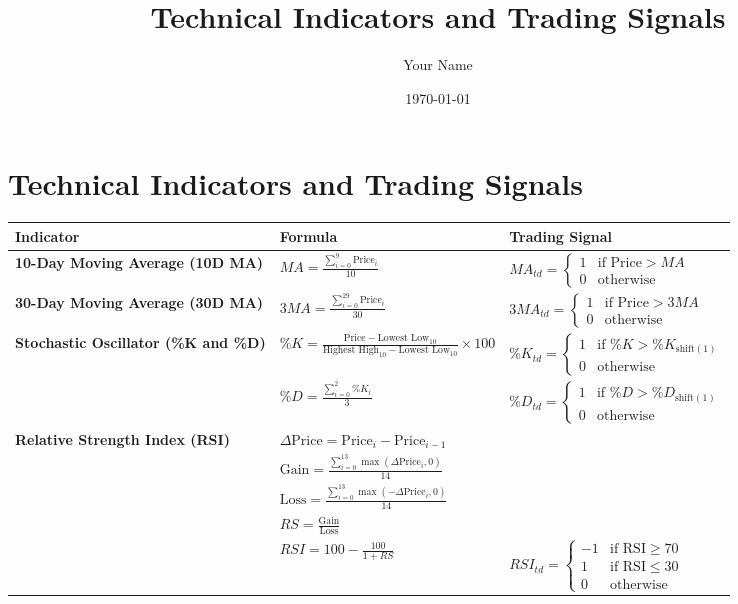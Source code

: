 \documentclass{article}
\begin{document}
\title{Technical Indicators and Trading Signals}
\author{Your Name}
\date{\today}
\maketitle

\section{Technical Indicators and Trading Signals}

\begin{table}[h!]
\centering
\begin{tabular}{| m{3cm} | m{8cm} | m{5cm} |}
\hline
\textbf{Indicator} & \textbf{Formula} & \textbf{Trading Signal} \\ \hline

\textbf{10-Day Moving Average (10D MA)} & 
$MA = \frac{\sum_{i=0}^{9} \text{Price}_i}{10}$ & 
$MA_{td} = \begin{cases} 
1 & \text{if Price} > MA \\
0 & \text{otherwise}
\end{cases}$ \\
\hline

\textbf{30-Day Moving Average (30D MA)} & 
$3MA = \frac{\sum_{i=0}^{29} \text{Price}_i}{30}$ & 
$3MA_{td} = \begin{cases} 
1 & \text{if Price} > 3MA \\
0 & \text{otherwise}
\end{cases}$ \\
\hline

\textbf{Stochastic Oscillator (\%K and \%D)} & 
$\%K = \frac{\text{Price} - \text{Lowest Low}_{10}}{\text{Highest High}_{10} - \text{Lowest Low}_{10}} \times 100$ &
$\%K_{td} = \begin{cases} 
1 & \text{if } \%K > \%K_{\text{shift}(1)} \\
0 & \text{otherwise}
\end{cases}$ \\
& $\%D = \frac{\sum_{i=0}^{2} \%K_i}{3}$ & 
$\%D_{td} = \begin{cases} 
1 & \text{if } \%D > \%D_{\text{shift}(1)} \\
0 & \text{otherwise}
\end{cases}$ \\
\hline

\textbf{Relative Strength Index (RSI)} & 
$\Delta \text{Price} = \text{Price}_{i} - \text{Price}_{i-1}$ \\
& $\text{Gain} = \frac{\sum_{i=0}^{13} \max(\Delta \text{Price}_i, 0)}{14}$ \\
& $\text{Loss} = \frac{\sum_{i=0}^{13} \max(-\Delta \text{Price}_i, 0)}{14}$ \\
& $RS = \frac{\text{Gain}}{\text{Loss}}$ \\
& $RSI = 100 - \frac{100}{1 + RS}$ &
$RSI_{td} = \begin{cases} 
-1 & \text{if RSI} \geq 70 \\
1 & \text{if RSI} \leq 30 \\
0 & \text{otherwise}
\end{cases}$ \\
\hline


\end{tabular}
\end{table}
\end{document}
